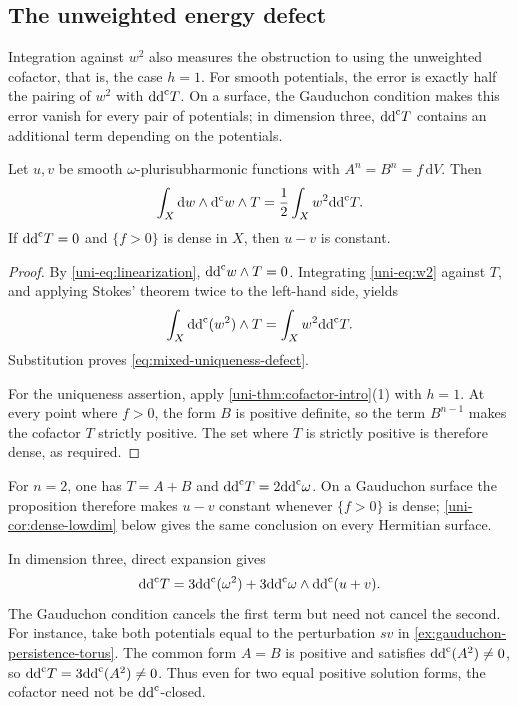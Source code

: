 \subsection{The unweighted energy defect}
\label{sec:gauduchon-surface-uniqueness}

Integration against $w^2$ also measures the obstruction to using the unweighted cofactor, that is, the case $h=1$. For smooth potentials, the error is exactly half the pairing of $w^2$ with $\mathrm{dd}^{\mathrm{c}} T$. On a surface, the Gauduchon condition makes this error vanish for every pair of potentials; in dimension three, $\mathrm{dd}^{\mathrm{c}} T$ contains an additional term depending on the potentials.

\begin{proposition}\label{prop:mixed-ddc-uniqueness}
Let $u,v$ be smooth $\omega$-plurisubharmonic functions with $A^n=B^n=f\,\mathrm{d}V$.
Then
\begin{equation}\label{eq:mixed-uniqueness-defect}
 \int_X \mathrm{d}w\wedge\mathrm d^{\mathrm c} w\wedge T
       =\frac12\int_X w^2\mathrm{dd}^{\mathrm{c}} T.
\end{equation}
If $\mathrm{dd}^{\mathrm{c}} T=0$ and $\{f>0\}$ is dense in $X$, then $u-v$ is constant.
\end{proposition}
\begin{proof}
By \eqref{uni-eq:linearization}, $\mathrm{dd}^{\mathrm{c}} w\wedge T=0$. Integrating \eqref{uni-eq:w2} against $T$, and applying Stokes' theorem twice to the left-hand side, yields
\[
 \int_X\mathrm{dd}^{\mathrm{c}}(w^2)\wedge T=\int_Xw^2\mathrm{dd}^{\mathrm{c}} T.
\]
Substitution proves \eqref{eq:mixed-uniqueness-defect}.

For the uniqueness assertion, apply \cref{uni-thm:cofactor-intro}(1) with $h=1$. At every point where $f>0$, the form $B$ is positive definite, so the term $B^{n-1}$ makes the cofactor $T$ strictly positive. The set where $T$ is strictly positive is therefore dense, as required.
\end{proof}

For $n=2$, one has $T=A+B$ and $\mathrm{dd}^{\mathrm{c}} T=2\mathrm{dd}^{\mathrm{c}}\omega$. On a Gauduchon surface the proposition therefore makes $u-v$ constant whenever $\{f>0\}$ is dense; \cref{uni-cor:dense-lowdim} below gives the same conclusion on every Hermitian surface.

In dimension three, direct expansion gives
\[
 \mathrm{dd}^{\mathrm{c}} T=3\mathrm{dd}^{\mathrm{c}}(\omega^2)+3\mathrm{dd}^{\mathrm{c}}\omega\wedge\mathrm{dd}^{\mathrm{c}}(u+v).
\]
The Gauduchon condition cancels the first term but need not cancel the second. For instance, take both potentials equal to the perturbation $sv$ in \cref{ex:gauduchon-persistence-torus}. The common form $A=B$ is positive and satisfies $\mathrm{dd}^{\mathrm{c}}(A^2)\ne0$, so $\mathrm{dd}^{\mathrm{c}} T=3\mathrm{dd}^{\mathrm{c}}(A^2)\ne0$. Thus even for two equal positive solution forms, the cofactor need not be $\mathrm{dd}^{\mathrm{c}}$-closed.
